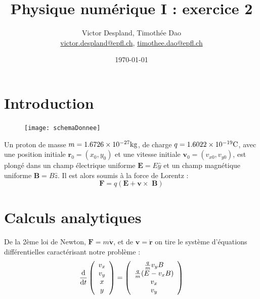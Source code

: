 \documentclass[a4paper,12pt,oneside]{article}
\def \be {\begin{equation}}
\def \ee {\end{equation}}
\def \dd  {{\rm d}}
\newcommand{\mail}[1]{{\href{mailto:#1}{#1}}}
\begin{document}
\title{Physique numérique I : exercice 2}
\date{\today}
\author{Victor Despland, Timothée Dao\\{\small \mail{victor.despland@epfl.ch}, \mail{timothee.dao@epfl.ch}}}
\maketitle
\tableofcontents


\newpage
\section{Introduction}

\intextsep=0cm
\begin{figure}
    \centering
    \texttt{[image: schemaDonnee]}
    \caption{\cite{donneeEX2}}
\end{figure}


Un proton de masse $m = 1.6726  \times 10^{-27 } \rm kg$, de charge $q = 1.6022 \times 10^{-19} \rm C$, avec une position initiale $\textbf{r}_0 = (x_0, y_0 )$ et une vitesse initiale $\textbf{v}_0 = (v_{x0} , v_{y0} )$, est plongé dans un champ électrique uniforme $\textbf{E} = E\hat{y}$ et un champ magnétique uniforme $\textbf{B} = B\hat{z} $. Il est alors soumis à la force de Lorentz : 
\be
\textbf{F} = q(\textbf{E} + \textbf{v} \times\textbf{ B})
\ee

\intextsep=0.5cm
\section{Calculs analytiques}
De la 2ème loi de Newton, $\textbf{F}=m\Dot{\textbf{v}}$, et de $\textbf{v}=\Dot{\textbf{r}}$ on tire le système d'équations différentielles caractérisant notre problème :
\be
\frac{\dd }{\dd t} 
\left( \begin{array}{c} v_x \\ v_y \\ x \\ y \end{array} \right)
=
\left( \begin{array}{c}
   \frac{q}{m} v_y B\\ \frac{q}{m} (E-v_x B) \\ 
   v_x \\ v_y
\end{array} \right)
\label{eq1}
\ee
\end{document}
